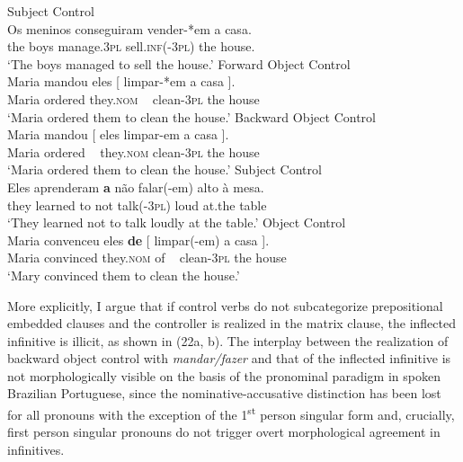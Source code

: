 \documentclass[output=paper]{langsci/langscibook}
\begin{document}
\ea%
    \label{ex:moreno:22}
    \ea  Subject Control\\ 
    \gll Os meninos  conseguiram  vender-*em   a casa.  \\
         the boys  manage.\textsc{3pl}   sell.\textsc{inf}(-\textsc{3pl}) the house.\\
    \glt ‘The boys managed to sell the house.’
    \ex  Forward Object Control\\
    \gll Maria mandou   eles    [ limpar-*em a    casa ].    \\
         Maria ordered    they.\textsc{nom}  ~ clean{}-\textsc{3pl}     the house\\
    \glt ‘Maria ordered them  to clean the house.’
    \ex  Backward Object Control\\
    \gll Maria mandou       [ eles limpar-em a        casa ].    \\
         Maria ordered      ~    they.\textsc{nom}   clean{}-\textsc{3pl}     the house\\
    \glt ‘Maria ordered them to clean the house.’
    \z
\z
\ea%
    \label{ex:moreno:23}
    \ea  Subject Control\\
    \gll Eles     aprenderam \textbf{a}  não   falar(-em)  alto  à        mesa.\\
         they    learned         to not    talk({}-\textsc{3pl})    loud at.the table  \\
    \glt ‘They learned not to talk loudly at the table.’
    \ex  Object Control\\
    \gll Maria  convenceu eles          \textbf{de}  [  limpar(-em) a    casa ].     \\
         Maria  convinced they.\textsc{nom} of    ~ clean-\textsc{3pl}     the house\\
    \glt ‘Mary convinced them to clean the house.’
    \z
\z

More explicitly, I argue that if control verbs do not subcategorize prepositional embedded clauses and the controller is realized in the matrix clause, the inflected infinitive is illicit, as shown in (22a, b). The interplay between the realization of backward object control with \textit{mandar/fazer} and that of the inflected infinitive is not morphologically visible on the basis of the pronominal paradigm in spoken Brazilian Portuguese, since the nominative-accusative distinction has been lost for all pronouns with the exception of the 1\textsuperscript{st} person singular form and, crucially, first person singular pronouns do not trigger overt morphological agreement in infinitives. 
\end{document}

